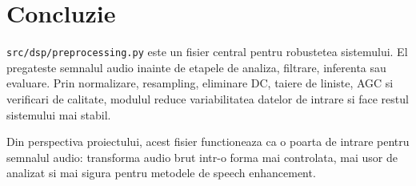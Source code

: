 \documentclass[12pt,a4paper]{report}
\begin{document}
\chapter{Concluzie}

\texttt{src/dsp/preprocessing.py} este un fisier central pentru robustetea sistemului. El pregateste semnalul audio inainte de etapele de analiza, filtrare, inferenta sau evaluare. Prin normalizare, resampling, eliminare DC, taiere de liniste, AGC si verificari de calitate, modulul reduce variabilitatea datelor de intrare si face restul sistemului mai stabil.

Din perspectiva proiectului, acest fisier functioneaza ca o poarta de intrare pentru semnalul audio: transforma audio brut intr-o forma mai controlata, mai usor de analizat si mai sigura pentru metodele de speech enhancement.
\end{document}
